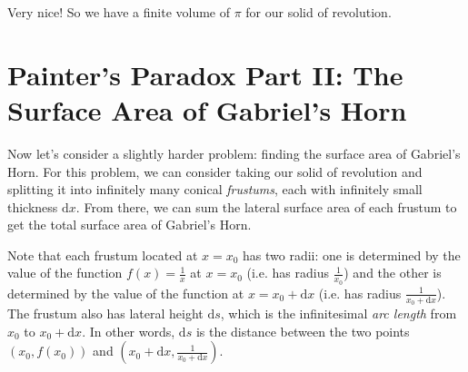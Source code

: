 \documentclass{article}[11pt]
\begin{document}
Very nice! So we have a finite volume of $\pi$ for our solid of revolution.

\section{Painter's Paradox Part II: The Surface Area of Gabriel's Horn}
Now let's consider a slightly harder problem: finding the surface area of Gabriel's Horn. For this problem, we can consider taking our solid of revolution and splitting it into infinitely many conical \emph{frustums}, each with infinitely small thickness $\textrm{d}x$. From there, we can sum the lateral surface area of each frustum to get the total surface area of Gabriel's Horn.

\begin{center}
\end{center}

Note that each frustum located at $x=x_0$ has two radii: one is determined by the value of the function $f(x) = \frac1x$ at $x=x_0$ (i.e. has radius $\frac1{x_0}$) and the other is determined by the value of the function at $x=x_0+\textrm{d}x$ (i.e. has radius $\frac1{x_0+\textrm{d}x}$). The frustum also has lateral height $\textrm{d}s$, which is the infinitesimal \emph{arc length} from $x_0$ to $x_0 + \textrm{d}x$. In other words, $\textrm{d}s$ is the distance between the two points $(x_0, f(x_0))$ and $(x_0 + \textrm{d}x, \frac1{x_0 + \textrm{d}x})$.
\end{document}
